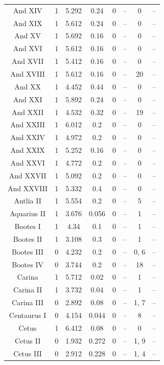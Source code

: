 \documentclass[twocolumn]{aastex631}
\begin{document}
\begin{longtable}{cccccccc}
And XIV & 1 & 5.292 & 0.24 & 0 & -- & 0 & -- \\
And XIX & 1 & 5.612 & 0.24 & 0 & -- & 0 & -- \\
And XV & 1 & 5.692 & 0.16 & 0 & -- & 0 & -- \\
And XVI & 1 & 5.612 & 0.16 & 0 & -- & 0 & -- \\
And XVII & 1 & 5.412 & 0.16 & 0 & -- & 0 & -- \\
And XVIII & 1 & 5.612 & 0.16 & 0 & -- & 20 & -- \\ %
And XX & 1 & 4.452 & 0.44 & 0 & -- & 0 & -- \\ 
And XXI & 1 & 5.892 & 0.24 & 0 & -- & 0 & -- \\
And XXII & 1 & 4.532 & 0.32 & 0 & -- & 19 & -- \\ 
And XXIII & 1 & 6.012 & 0.2 & 0 & -- & 0 & -- \\ 
And XXIV & 1 & 4.972 & 0.2 & 0 & -- & 0 & -- \\
And XXIX & 1 & 5.252 & 0.16 & 0 & -- & 0 & -- \\
And XXVI & 1 & 4.772 & 0.2 & 0 & -- & 0 & -- \\
And XXVII & 1 & 5.092 & 0.2 & 0 & -- & 0 & -- \\ %
And XXVIII & 1 & 5.332 & 0.4 & 0 & -- & 0 & -- \\ %
Antlia II & 1 & 5.554 & 0.2 & 0 & -- & 5 & -- \\
Aquarius II & 1 & 3.676 & 0.056 & 0 & -- & 1 & -- \\
Bootes I & 1 & 4.34 & 0.1 & 0 & -- & 1 & -- \\
Bootes II & 1 & 3.108 & 0.3 & 0 & -- & 1 & -- \\ %
Bootes III & 0 & 4.232 & 0.2 & 0 & -- & 0, 6 & -- \\
Bootes IV & 0 & 3.744 & 0.2 & 0 & -- & 18 & -- \\
Carina & 1 & 5.712 & 0.02 & 0 & -- & 1 & -- \\
Carina II & 1 & 3.732 & 0.04 & 0 & -- & 1 & -- \\
Carina III & 0 & 2.892 & 0.08 & 0 & -- & 1, 7 & -- \\
Centaurus I & 0 & 4.154 & 0.044 & 0 & -- & 8 & -- \\
Cetus & 1 & 6.412 & 0.08 & 0 & -- & 0 & -- \\
Cetus II & 0 & 1.932 & 0.272 & 0 & -- & 1, 9 & -- \\
Cetus III & 0 & 2.912 & 0.228 & 0 & -- & 1, 4 & -- \\ %

\end{longtable}
\end{document}
